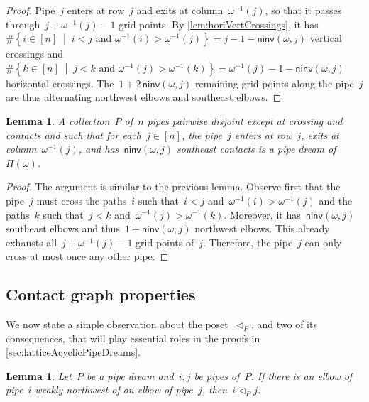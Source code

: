 \documentclass[reqno]{amsart}
\newtheorem{lemma}[theorem]{Lemma}
\theoremstyle{definition}
\newcommand{\set}[2]{\left\{ #1 \;\middle|\; #2 \right\}} %
\newcommand{\pipeDreams}{\Pi} %
\newcommand{\noninversions}[2]{\mathsf{ninv}(#1,#2)} %
\newcommand{\less}{\vartriangleleft} %
\newcommand{\contactLess}[1]{\less_{#1}} %
\begin{document}
\begin{proof}
Pipe~$j$ enters at row~$j$ and exits at column~$\omega^{-1}(j)$, so that it passes through~$j+\omega^{-1}(j)-1$ grid points.
By \cref{lem:horiVertCrossings}, it has~$\#\set{i \in [n]}{i < j \text{ and } \omega^{-1}(i) > \omega^{-1}(j)} = j-1-\noninversions{\omega}{j}$ vertical crossings and~$\#\set{k \in [n]}{j < k \text{ and } \omega^{-1}(j) > \omega^{-1}(k)} = \omega^{-1}(j)-1-\noninversions{\omega}{j}$ horizontal crossings.
The~$1+2\,\noninversions{\omega}{j}$ remaining grid points along the pipe~$j$ are thus alternating northwest elbows and southeast elbows.
\end{proof}

\begin{lemma}
\label{lem:characterizationPipeDreams}
A collection~$P$ of~$n$ pipes pairwise disjoint except at crossing and contacts and such that for each~$j \in [n]$, the pipe~$j$ enters at row~$j$, exits at column~$\omega^{-1}(j)$, and has~$\noninversions{\omega}{j}$ southeast contacts is a pipe dream of~$\pipeDreams(\omega)$.
\end{lemma}

\begin{proof}
The argument is similar to the previous lemma.
Observe first that the pipe~$j$ must cross the paths~$i$ such that~$i < j$ and~$\omega^{-1}(i) > \omega^{-1}(j)$ and the paths~$k$ such that~$j < k$ and~$\omega^{-1}(j) > \omega^{-1}(k)$.
Moreover, it has~$\noninversions{\omega}{j}$ southeast elbows and thus~$1+\noninversions{\omega}{j}$ northwest elbows.
This already exhausts all~$j+\omega^{-1}(j)-1$ grid points of~$j$.
Therefore, the pipe~$j$ can only cross at most once any other pipe.
\end{proof}


\subsection{Contact graph properties}
\label{subsec:contactGraph}

We now state a simple observation about the poset~$\contactLess{P}$, and two of its consequences, that will play essential roles in the proofs in \cref{sec:latticeAcyclicPipeDreams}.

\begin{lemma}
\label{lem:rectangle}
Let~$P$ be a pipe dream and~$i,j$ be pipes of~$P$.
If there is an elbow of pipe~$i$ weakly northwest of an elbow of pipe~$j$, then~$i \contactLess{P} j$.
\end{lemma}
\end{document}
